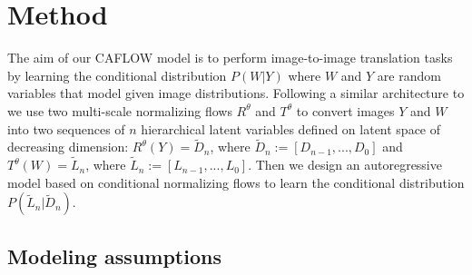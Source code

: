 \section{Method}\label{ch1:sec:Caflow}
The aim of our CAFLOW model is to perform image-to-image translation tasks by learning the conditional distribution $P(W|Y)$ where $W$ and $Y$ are random variables that model given image distributions.
Following a similar architecture to \cite{Dual-Glow} we use two multi-scale normalizing flows $R^\theta$ and $T^\theta$ to convert images $Y$ and $W$ into two sequences of $n$ hierarchical latent variables defined on latent space of decreasing dimension: \(R^\theta(Y)=\tilde{D}_n\), where \(\tilde{D}_n:=[D_{n-1}, ..., D_0]\) and \(T^\theta(W)=\tilde{L}_n\), where \(\tilde{L}_n := [L_{n-1}, ..., L_0]\). Then we design an autoregressive model based on conditional normalizing flows to learn the conditional distribution $P(\tilde{L}_n| \tilde{D}_n)$.

\subsection{Modeling assumptions}\label{ch1:subsec:modass}

